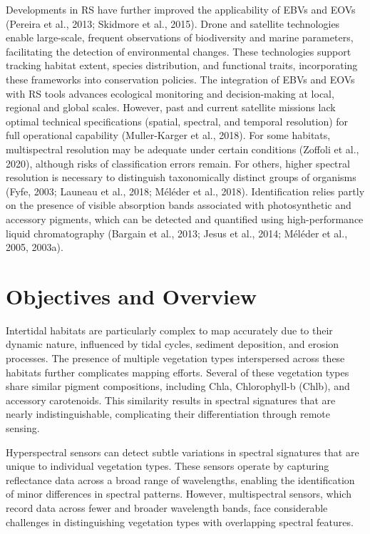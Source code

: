 \documentclass[
  letterpaper,
  11pt,
  english,
  singlespacing,
  headsepline]{MastersDoctoralThesis}
\begin{document}
\begin{spacing}{1.5}
Developments in RS have further improved the applicability of EBVs and
EOVs (Pereira et al., 2013; Skidmore et al., 2015). Drone and satellite
technologies enable large-scale, frequent observations of biodiversity
and marine parameters, facilitating the detection of environmental
changes. These technologies support tracking habitat extent, species
distribution, and functional traits, incorporating these frameworks into
conservation policies. The integration of EBVs and EOVs with RS tools
advances ecological monitoring and decision-making at local, regional
and global scales. However, past and current satellite missions lack
optimal technical specifications (spatial, spectral, and temporal
resolution) for full operational capability (Muller-Karger et al.,
2018). For some habitats, multispectral resolution may be adequate under
certain conditions (Zoffoli et al., 2020), although risks of
classification errors remain. For others, higher spectral resolution is
necessary to distinguish taxonomically distinct groups of organisms
(Fyfe, 2003; Launeau et al., 2018; Méléder et al., 2018). Identification
relies partly on the presence of visible absorption bands associated
with photosynthetic and accessory pigments, which can be detected and
quantified using high-performance liquid chromatography (Bargain et al.,
2013; Jesus et al., 2014; Méléder et al., 2005, 2003a).

\section{Objectives and Overview}\label{objectives-and-overview}

Intertidal habitats are particularly complex to map accurately due to
their dynamic nature, influenced by tidal cycles, sediment deposition,
and erosion processes. The presence of multiple vegetation types
interspersed across these habitats further complicates mapping efforts.
Several of these vegetation types share similar pigment compositions,
including Chla, Chlorophyll-b (Chlb), and accessory carotenoids. This
similarity results in spectral signatures that are nearly
indistinguishable, complicating their differentiation through remote
sensing.

Hyperspectral sensors can detect subtle variations in spectral
signatures that are unique to individual vegetation types. These sensors
operate by capturing reflectance data across a broad range of
wavelengths, enabling the identification of minor differences in
spectral patterns. However, multispectral sensors, which record data
across fewer and broader wavelength bands, face considerable challenges
in distinguishing vegetation types with overlapping spectral features.


\end{spacing}
\end{document}
